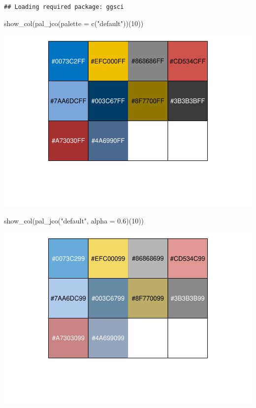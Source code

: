 \documentclass[
]{article}
\newenvironment{Shaded}{\begin{snugshade}}{\end{snugshade}}
\newcommand{\AttributeTok}[1]{\textcolor[rgb]{0.77,0.63,0.00}{#1}}
\newcommand{\DecValTok}[1]{\textcolor[rgb]{0.00,0.00,0.81}{#1}}
\newcommand{\FloatTok}[1]{\textcolor[rgb]{0.00,0.00,0.81}{#1}}
\newcommand{\FunctionTok}[1]{\textcolor[rgb]{0.00,0.00,0.00}{#1}}
\newcommand{\NormalTok}[1]{#1}
\newcommand{\StringTok}[1]{\textcolor[rgb]{0.31,0.60,0.02}{#1}}
\begin{document}
\begin{verbatim}
## Loading required package: ggsci
\end{verbatim}

\begin{Shaded}
\begin{Highlighting}[]
\FunctionTok{show\_col}\NormalTok{(}\FunctionTok{pal\_jco}\NormalTok{(}\AttributeTok{palette =} \FunctionTok{c}\NormalTok{(}\StringTok{"default"}\NormalTok{))(}\DecValTok{10}\NormalTok{))}
\end{Highlighting}
\end{Shaded}

\includegraphics{clusterjerarquico1_files/figure-latex/unnamed-chunk-9-1.pdf}

\begin{Shaded}
\begin{Highlighting}[]
\FunctionTok{show\_col}\NormalTok{(}\FunctionTok{pal\_jco}\NormalTok{(}\StringTok{"default"}\NormalTok{, }\AttributeTok{alpha =} \FloatTok{0.6}\NormalTok{)(}\DecValTok{10}\NormalTok{))}
\end{Highlighting}
\end{Shaded}

\includegraphics{clusterjerarquico1_files/figure-latex/unnamed-chunk-9-2.pdf}
\end{document}
